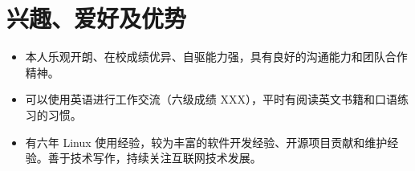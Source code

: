 \documentclass{resume}
\begin{document}
\section{兴趣、爱好及优势}

\begin{itemize}
  \item 本人乐观开朗、在校成绩优异、自驱能力强，具有良好的沟通能力和团队合作精神。
  \item 可以使用英语进行工作交流（六级成绩 XXX），平时有阅读英文书籍和口语练习的习惯。
  \item 有六年 Linux 使用经验，较为丰富的软件开发经验、开源项目贡献和维护经验。善于技术写作，持续关注互联网技术发展。
\end{itemize}
\end{document}
